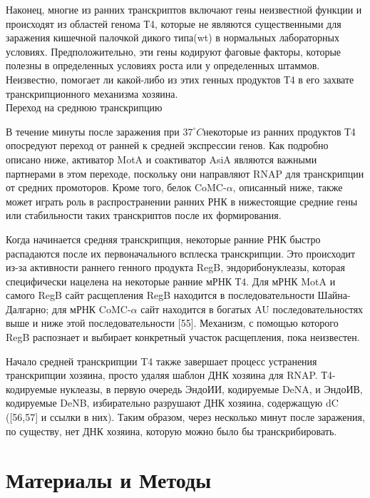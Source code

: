 \documentclass[a4paper,12pt]{article}
\begin{document}
            \par{Наконец, многие из ранних транскриптов включают гены неизвестной функции и происходят из областей генома
            Т4, которые не являются существенными для заражения кишечной палочкой дикого типа(wt) в нормальных
            лабораторных условиях. Предположительно, эти гены кодируют фаговые факторы, которые полезны в определенных
            условиях роста или у определенных штаммов. Неизвестно, помогает ли какой-либо из этих генных продуктов Т4 в
            его захвате транскрипционного механизма хозяина.} \\
        {\Large Переход на среднюю транскрипцию}
            \par{В течение минуты после заражения при $ 37^{\circ}C $некоторые из ранних продуктов Т4 опосредуют переход
            от ранней к средней экспрессии генов. Как подробно описано ниже, активатор MotA и соактиватор AsiA являются
            важными партнерами в этом переходе, поскольку они направляют RNAP для транскрипции от средних промоторов.
            Кроме того, белок CoMC-$\alpha$, описанный ниже, также может играть роль в распространении ранних РНК в
            нижестоящие средние гены или стабильности таких транскриптов после их формирования.}
            \par{Когда начинается средняя транскрипция, некоторые ранние РНК быстро распадаются после их первоначального
            всплеска транскрипции. Это происходит из-за активности раннего генного продукта RegB, эндорибонуклеазы,
            которая специфически нацелена на некоторые ранние мРНК Т4. Для мРНК MotA и самого RegB сайт расщепления RegB
            находится в последовательности Шайна-Далгарно; для мРНК CoMC-$\alpha$ сайт находится в богатых AU
            последовательностях выше и ниже этой последовательности [55]. Механизм, с помощью которого RegB распознает и
            выбирает конкретный участок расщепления, пока неизвестен.}
            \par{Начало средней транскрипции T4 также завершает процесс устранения транскрипции хозяина, просто удаляя
            шаблон ДНК хозяина для RNAP. Т4-кодируемые нуклеазы, в первую очередь ЭндоИИ, кодируемые DeNA, и ЭндоИВ,
            кодируемые DeNB, избирательно разрушают ДНК хозяина, содержащую dC ([56,57] и ссылки в них). Таким образом,
            через несколько минут после заражения, по существу, нет ДНК хозяина, которую можно было бы транскрибировать.}

\newpage
\section{Материалы и Методы} \label{sec:code}
\end{document}
